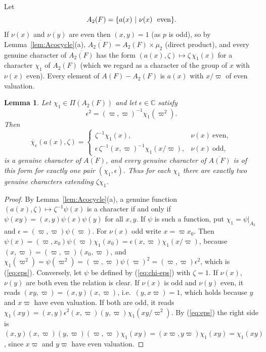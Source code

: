 \documentclass[12pt,letterpaper]{book}
\theoremstyle{plain}
\newtheorem{lemma}[theorem]{Lemma}
\theoremstyle{definition}
\theoremstyle{remark}
\theoremstyle{remark}
\begin{document}
Let
\[
A_2(F)=\{a(x)\ |\ \nu (x)\ {\rm \ even}\}.
\]
If $\nu(x)$ and $\nu(y)$ are even then $(x,y)=1$ (as $p$ is odd), so by
Lemma~\ref{lem:Acocycle}(a), $\overline{A_2(F)}=A_2(F)\times \mu_2$
(direct product), and every genuine character of $\overline{A_2(F)}$
has the form $(a(x),\zeta)\mapsto\zeta\,\chi_1(x)$ for a character
$\chi_1$ of $A_2(F)$ (which we regard as a character of the group of
$x$ with $\nu(x)$ even). Every element of $A(F)-A_2(F)$ is $a(x)$ with
$x/\varpi$ of even valuation.

\begin{lemma}\label{lem:genuine-chars}
Let $\chi_1\in\Pi(A_2(F))$ and let $\epsilon\in{\mathbb C}$ satisfy
\begin{equation}\label{eq:eps}
\epsilon^2=(\varpi,\varpi)^{-1}\chi_1(\varpi^2).
\end{equation}
Then
\begin{equation}\label{eq:chi-eps}
\overline{\chi}_\epsilon (a(x),\zeta)=
\left\{
\begin{array}{ll}
\zeta^{-1}\chi_1(x), & \nu(x)\ \text{even},\\
\epsilon\,\zeta^{-1}(x,\varpi)^{-1}\chi_1(x/\varpi),
& \nu(x)\ \text{odd},
\end{array}
\right.
\end{equation}
is a genuine character of $\overline{A(F)}$, and every genuine character
of $\overline{A(F)}$ is of this form for exactly one pair
$(\chi_1,\epsilon)$. Thus for each $\chi_1$ there are exactly two genuine
characters extending $\zeta\chi_1$.
\end{lemma}

\begin{proof}
By Lemma~\ref{lem:Acocycle}(a), a genuine function
$(a(x),\zeta)\mapsto\zeta^{-1}\psi(x)$ is a character if and only if
$\psi(xy)=(x,y)\psi(x)\psi(y)$ for all $x,y$. If $\psi$ is such a
function, put $\chi_1=\psi|_{A_2}$ and
$\epsilon=(\varpi,\varpi)\psi(\varpi)$. For $\nu(x)$ odd write
$x=\varpi x_0$. Then
$\psi(x)=(\varpi,x_0)\psi(\varpi)\chi_1(x_0)=\epsilon(x,\varpi)\chi_1(x/\varpi)$,
because $(x,\varpi)=(\varpi,\varpi)(x_0,\varpi)$, and
$\chi_1(\varpi^2)=\psi(\varpi^2)=(\varpi,\varpi)\psi(\varpi)^2
=(\varpi,\varpi)\epsilon^2$, which is (\ref{eq:eps}). Conversely, let
$\psi$ be defined by (\ref{eq:chi-eps}) with $\zeta=1$. If $\nu(x)$,
$\nu(y)$ are both even the relation is clear. If $\nu(x)$ is odd and
$\nu(y)$ even, it reads $(xy,\varpi)=(x,y)(x,\varpi)$, i.e.\
$(y,x\varpi)=1$, which holds because $y$ and $x\varpi$ have even
valuation. If both are odd, it reads
$\chi_1(xy)=(x,y)\epsilon^2(x,\varpi)(y,\varpi)\chi_1(xy/\varpi^2)$. By
(\ref{eq:eps}) the right side is
$(x,y)(x,\varpi)(y,\varpi)(\varpi,\varpi)\chi_1(xy)
=(x\varpi,y\varpi)\chi_1(xy)=\chi_1(xy)$, since $x\varpi$ and $y\varpi$
have even valuation.
\end{proof}
\end{document}
